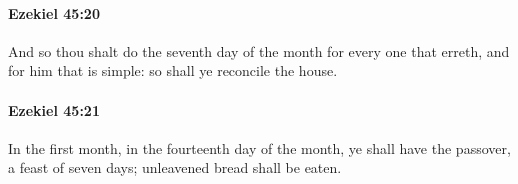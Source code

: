 		\paragraph{Ezekiel 45:20} %
			\label{EZEKIEL-45-20}

			And so thou shalt do the seventh day of the month for every one that erreth, and for him that is simple: so shall ye reconcile the house.


		\paragraph{Ezekiel 45:21} %
			\label{EZEKIEL-45-21}

			In the first month, in the fourteenth day of the month, ye shall have the passover, a feast of seven days; unleavened bread shall be eaten.


